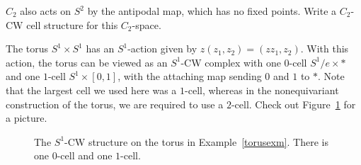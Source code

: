 \begin{ex}
$C_2$ also acts on $S^2$ by the antipodal map, which has no fixed points. Write a $C_2$-CW cell structure for this
$C_2$-space.
\end{ex}

\begin{exm}
\label{torusexm}
The torus $S^1 \times S^1$ has an $S^1$-action given by $z(z_1, z_2) = (zz_1, z_2)$. With this action, the torus
can be viewed as an $S^1$-CW complex with one $0$-cell $S^1/e \times *$ and one $1$-cell $S^1 \times [0,1]$, with
the attaching map sending $0$ and $1$ to $*$. Note that the largest cell we used here was a $1$-cell, whereas in
the nonequivariant construction of the torus, we are required to use a $2$-cell. Check out
Figure~\ref{equivariant_torus} for a picture.
\begin{figure}[h!]
\def\torlen{3}
\caption{The $S^1$-CW structure on the torus in Example~\ref{torusexm}. There is one $0$-cell and one $1$-cell.}
\label{equivariant_torus}
\end{figure}
\end{exm}
